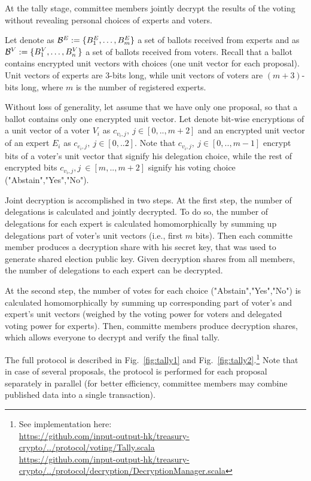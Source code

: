 At the tally stage, committee members jointly decrypt the results of the voting without revealing personal choices of experts and voters. 

Let denote as $\mathcal{B}^E:=\{B^E_1,\ldots, B^E_m \}$ a set of ballots received from experts and as $\mathcal{B}^V:=\{B^V_1,\ldots, B^V_n \}$ a set of ballots received from voters. Recall that a ballot contains encrypted unit vectors with choices (one unit vector for each proposal). Unit vectors of experts are $3$-bits long, while unit vectors of voters are $(m+3)$-bits long, where $m$ is the number of registered experts.

Without loss of generality, let assume that we have only one proposal, so that a ballot contains only one encrypted unit vector. Let denote bit-wise encryptions of a unit vector of a voter $V_i$ as $c_{v_i,j},\ j\in [0,..,m+2]$ and an encrypted unit vector of an expert $E_i$ as $c_{e_i,j},\ j\in [0,..2]$. Note that $c_{v_i,j},\ j\in [0,..,m-1]$ encrypt bits of a voter's unit vector that signify his delegation choice, while the rest of encrypted bits $c_{v_i,j},j\ \in [m,..,m+2]$ signify his voting choice ("Abstain","Yes","No").

Joint decryption is accomplished in two steps. At the first step, the number of delegations is calculated and jointly decrypted. To do so, the number of delegations for each expert is calculated homomorphically by summing up delegations part of voter's unit vectors (i.e., first $m$ bits). Then each committe member produces a decryption share with his secret key, that was used to generate shared election public key. Given decryption shares from all members, the number of delegations to each expert can be decrypted.

At the second step, the number of votes for each choice ("Abstain","Yes","No") is calculated homomorphically by summing up corresponding part of voter's and expert's unit vectors (weighed by the voting power for voters and delegated voting power for experts). Then, committe members produce decryption shares, which allows everyone to decrypt and verify the final tally.

The full protocol is described in Fig.~\ref{fig:tally1} and Fig.~\ref{fig:tally2}.\footnote{See implementation here:\\ \href{https://github.com/input-output-hk/treasury-crypto/blob/master/src/main/scala/io/iohk/protocol/voting/Tally.scala}{https://github.com/input-output-hk/treasury-crypto/../protocol/voting/Tally.scala}\\ \href{https://github.com/input-output-hk/treasury-crypto/blob/master/src/main/scala/io/iohk/protocol/decryption/DecryptionManager.scala}{https://github.com/input-output-hk/treasury-crypto/../protocol/decryption/DecryptionManager.scala}} Note that in case of several proposals, the protocol is performed for each proposal separately in parallel (for better efficiency, committee members may combine published data into a single transaction).


